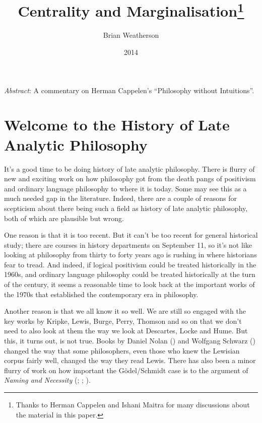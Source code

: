 \documentclass[
  11pt,
  letterpaper,
  DIV=11,
  numbers=noendperiod,
  twoside]{scrartcl}
\title{Centrality and Marginalisation\thanks{Thanks to Herman Cappelen
and Ishani Maitra for many discussions about the material in this
paper.}}
\author{Brian Weatherson}
\date{2014}
\renewenvironment{abstract}
 {\vspace{-1.25cm}
 \quotation\small\noindent\emph{Abstract}:}
 {\endquotation}
\renewenvironment{abstract}
 {\quotation\small\noindent\emph{Abstract}:}
 {\endquotation\vspace{-0.02cm}}
\begin{document}
\maketitle
\begin{abstract}
A commentary on Herman Cappelen's ``Philosophy without Intuitions''.
\end{abstract}


\section{Welcome to the History of Late Analytic
Philosophy}\label{sec-Intro}

It's a good time to be doing history of late analytic philosophy. There
is flurry of new and exciting work on how philosophy got from the death
pangs of positivism and ordinary language philosophy to where it is
today. Some may see this as a much needed gap in the literature. Indeed,
there are a couple of reasons for scepticism about there being such a
field as history of late analytic philosophy, both of which are
plausible but wrong.

One reason is that it is too recent. But it can't be too recent for
general historical study; there are courses in history departments on
September 11, so it's not like looking at philosophy from thirty to
forty years ago is rushing in where historians fear to tread. And
indeed, if logical positivism could be treated historically in the
1960s, and ordinary language philosophy could be treated historically at
the turn of the century, it seems a reasonable time to look back at the
important works of the 1970s that established the contemporary era in
philosophy.

Another reason is that we all know it so well. We are still so engaged
with the key works by Kripke, Lewis, Burge, Perry, Thomson and so on
that we don't need to also look at them the way we look at Descartes,
Locke and Hume. But this, it turns out, is not true. Books by Daniel
Nolan () and Wolfgang Schwarz
() changed the way that some
philosophers, even those who knew the Lewisian corpus fairly well,
changed the way they read Lewis. There has also been a minor flurry of
work on how important the Gödel/Schmidt case is to the argument of
\emph{Naming and Necessity} (;
;
).
\end{document}
